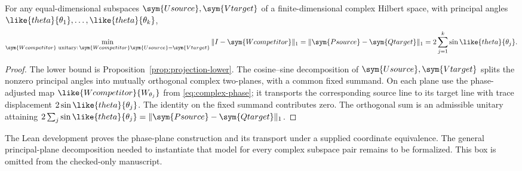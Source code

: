 \ifincludeUnformalizedComplexTrace
\begin{tcolorbox}[
 enhanced,breakable,colback=white,colframe=red!80!black,
 colbacktitle=red!6!white,coltitle=red!80!black,
 title={Working extension --- not yet formalized for arbitrary complex pairs},
 fonttitle=\bfseries,boxrule=1pt,
 left=9pt,right=9pt,top=9pt,bottom=9pt,
 before skip=12pt,after skip=12pt]
\begin{proposition}
\label{prop:complex-trace-all-pairs}
For any equal-dimensional subspaces $\sym{Usource},\sym{Vtarget}$ of a finite-dimensional complex
Hilbert space, with principal angles $\like{theta}{\theta_1},\ldots,\like{theta}{\theta_k}$,
\[
 \min_{\sym{Wcompetitor}\text{ unitary}:\,\sym{Wcompetitor}\sym{Usource}=\sym{Vtarget}}\|I-\sym{Wcompetitor}\|_1
 =\|\sym{Psource}-\sym{Qtarget}\|_1=2\sum_{j=1}^k\sin\like{theta}{\theta_j}.
\]
\end{proposition}
\begin{proof}
The lower bound is Proposition~\ref{prop:projection-lower}. The cosine--sine
decomposition of $\sym{Usource},\sym{Vtarget}$ splits the nonzero principal angles into mutually
orthogonal complex two-planes, with a common fixed summand. On each plane
use the phase-adjusted map $\like{Wcompetitor}{W_{\theta_j}}$ from
\cref{eq:complex-phase}; it transports the corresponding source line
to its target line with trace displacement $2\sin\like{theta}{\theta_j}$. The identity
on the fixed summand contributes zero. The orthogonal sum is an
admissible unitary attaining $2\sum_j\sin\like{theta}{\theta_j}=\|\sym{Psource}-\sym{Qtarget}\|_1$.
\end{proof}

The Lean development proves the phase-plane construction and its
transport under a supplied coordinate equivalence. The general
principal-plane decomposition needed to instantiate that model for every
complex subspace pair remains to be formalized. This box is omitted from
the checked-only manuscript.
\end{tcolorbox}
\fi

